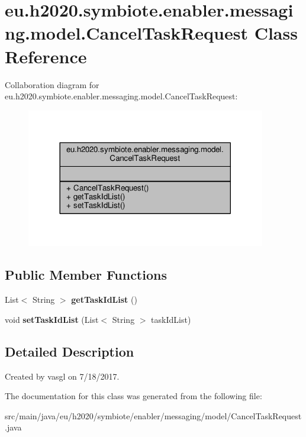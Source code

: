 \hypertarget{classeu_1_1h2020_1_1symbiote_1_1enabler_1_1messaging_1_1model_1_1CancelTaskRequest}{}\section{eu.\+h2020.\+symbiote.\+enabler.\+messaging.\+model.\+Cancel\+Task\+Request Class Reference}
\label{classeu_1_1h2020_1_1symbiote_1_1enabler_1_1messaging_1_1model_1_1CancelTaskRequest}


Collaboration diagram for eu.\+h2020.\+symbiote.\+enabler.\+messaging.\+model.\+Cancel\+Task\+Request\+:
\nopagebreak
\begin{figure}[H]
\begin{center}
\leavevmode
\includegraphics[width=296pt]{classeu_1_1h2020_1_1symbiote_1_1enabler_1_1messaging_1_1model_1_1CancelTaskRequest__coll__graph}
\end{center}
\end{figure}
\subsection*{Public Member Functions}
\begin{DoxyCompactItemize}
\item 
\mbox{\label{classeu_1_1h2020_1_1symbiote_1_1enabler_1_1messaging_1_1model_1_1CancelTaskRequest_abbc53a13b031cc08ee2d11f8fd5dce2e}} 
List$<$ String $>$ {\bfseries get\+Task\+Id\+List} ()
\item 
\mbox{\label{classeu_1_1h2020_1_1symbiote_1_1enabler_1_1messaging_1_1model_1_1CancelTaskRequest_ac2f07d5070cdff8b76e643b91d352331}} 
void {\bfseries set\+Task\+Id\+List} (List$<$ String $>$ task\+Id\+List)
\end{DoxyCompactItemize}


\subsection{Detailed Description}
Created by vasgl on 7/18/2017. 

The documentation for this class was generated from the following file\+:\begin{DoxyCompactItemize}
\item 
src/main/java/eu/h2020/symbiote/enabler/messaging/model/Cancel\+Task\+Request.\+java\end{DoxyCompactItemize}
